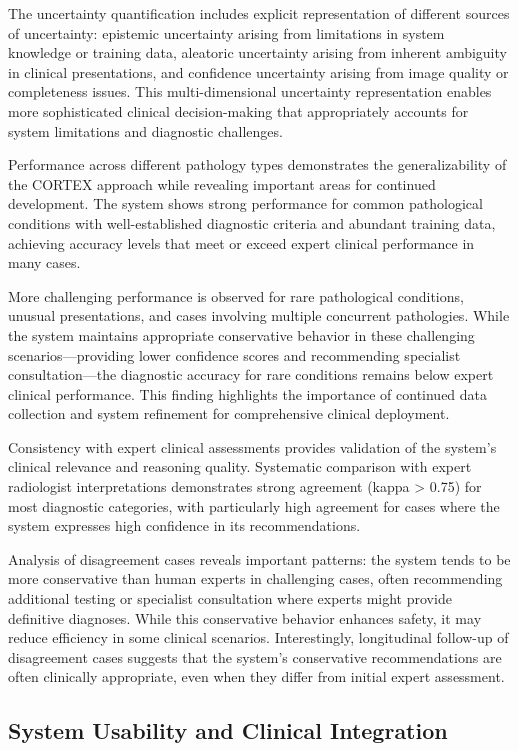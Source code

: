 The uncertainty quantification includes explicit representation of different sources of uncertainty: epistemic uncertainty arising from limitations in system knowledge or training data, aleatoric uncertainty arising from inherent ambiguity in clinical presentations, and confidence uncertainty arising from image quality or completeness issues. This multi-dimensional uncertainty representation enables more sophisticated clinical decision-making that appropriately accounts for system limitations and diagnostic challenges.

Performance across different pathology types demonstrates the generalizability of the CORTEX approach while revealing important areas for continued development. The system shows strong performance for common pathological conditions with well-established diagnostic criteria and abundant training data, achieving accuracy levels that meet or exceed expert clinical performance in many cases.

More challenging performance is observed for rare pathological conditions, unusual presentations, and cases involving multiple concurrent pathologies. While the system maintains appropriate conservative behavior in these challenging scenarios—providing lower confidence scores and recommending specialist consultation—the diagnostic accuracy for rare conditions remains below expert clinical performance. This finding highlights the importance of continued data collection and system refinement for comprehensive clinical deployment.

Consistency with expert clinical assessments provides validation of the system's clinical relevance and reasoning quality. Systematic comparison with expert radiologist interpretations demonstrates strong agreement (kappa > 0.75) for most diagnostic categories, with particularly high agreement for cases where the system expresses high confidence in its recommendations.

Analysis of disagreement cases reveals important patterns: the system tends to be more conservative than human experts in challenging cases, often recommending additional testing or specialist consultation where experts might provide definitive diagnoses. While this conservative behavior enhances safety, it may reduce efficiency in some clinical scenarios. Interestingly, longitudinal follow-up of disagreement cases suggests that the system's conservative recommendations are often clinically appropriate, even when they differ from initial expert assessment.

\subsection{System Usability and Clinical Integration}

